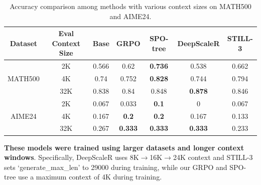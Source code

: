 \begin{table}[t]
\centering
\small
\begin{threeparttable}

    \begin{tabular}{ccccc|cc}
        \toprule
        \textbf{Dataset} & \textbf{Eval Context Size} & \textbf{Base} & \textbf{GRPO} & \textbf{SPO-tree} & \textbf{DeepScaleR\tnote{*}} & \textbf{STILL-3\tnote{*}} \\
        \midrule
        \multirow{3}{*}{MATH500} & 2K   & 0.566 & 0.62  & \textbf{0.736} & 0.538 & 0.662 \\
                                 & 4K   & 0.74  & 0.752 & \textbf{0.828} & 0.744 & 0.794 \\
                                 & 32K  & 0.838 & 0.84  & 0.848          & \textbf{0.878} & 0.846 \\

        \midrule
        \multirow{3}{*}{AIME24} & 2K    & 0.067    & 0.033    & \textbf{0.1}             & 0    & 0.067    \\
                                & 4K    & 0.167    & \textbf{0.2}    & \textbf{0.2}             & 0.167    & 0.133    \\
                                & 32K   & 0.267 & \textbf{0.333} & \textbf{0.333}          & \textbf{0.333} & 0.233 \\
\bottomrule
\end{tabular}
  \begin{tablenotes}
    \item[*] \textbf{These models were trained using larger datasets and longer context windows}. Specifically, DeepScaleR uses 8K$\to$16K$\to$24K context and STILL-3 sets `generate\_max\_len' to 29000 during training, while our GRPO and SPO-tree use a maximum context of 4K during training.
  \end{tablenotes}

\end{threeparttable}

\vspace{1em}
\caption{Accuracy comparison among methods with various context sizes on MATH500 and AIME24.}
\label{tab:context_accuracy}
\vspace{-0.5cm}
\end{table}

